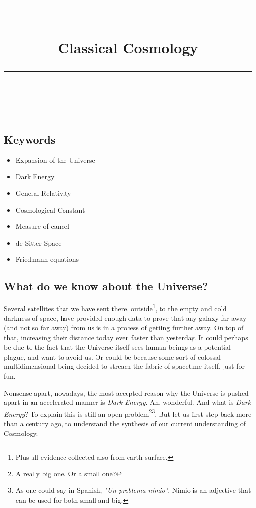 \documentclass[11pt, a4paper]{article} %
\title{	
	\normalfont\normalsize
	\textsc{}\\ %
	\vspace{5pt} %
	\rule{\linewidth}{0.2pt}\\ %
	\vspace{10pt} %
	{\huge Classical Cosmology}\\ %
	\vspace{5pt} %
	\rule{\linewidth}{-2pt}\\ %
	\vspace{-25pt} %
	\date{}
}
\author{}
\begin{document}
\maketitle 




\subsection*{Keywords}
\begin{itemize}
	\item Expansion of the Universe
	\item Dark Energy
	\item General Relativity
	\item Cosmological Constant
	\item Measure of cancel
	\item de Sitter Space
	\item Friedmann equations
\end{itemize}

\subsection*{What do we know about the Universe?}

Several satellites that we have sent there, outside\footnote{Plus all evidence collected also from earth surface.}, to the empty and cold darkness of space, have provided enough data to prove that any galaxy far away (and not so far away) from us is in a process of getting further away. On top of that, increasing their distance today even faster than yesterday. It could perhaps be due to the fact that the Universe itself sees human beings as a potential plague, and want to avoid us. Or could be because some sort of colossal multidimensional being decided to streach the fabric of spacetime itself, just for fun.

Nonsense apart, nowadays, the most accepted reason why the Universe is pushed apart in an accelerated manner is \textit{Dark Energy}. Ah, wonderful. And what is \textit{Dark Energy}? To explain this is still an open problem\footnote{A really big one. Or a small one?}\footnote{As one could say in Spanish, \textit{"Un problema nimio"}. Nimio is an adjective that can be used for both small and big.}. But let us first step back more than a century ago, to understand the synthesis of our current understanding of Cosmology.
\end{document}
